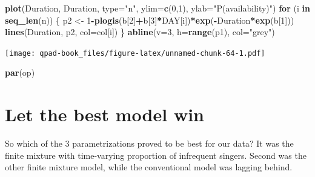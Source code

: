 \documentclass[12pt,]{book}
\newenvironment{Shaded}{\begin{snugshade}}{\end{snugshade}}
\newcommand{\ControlFlowTok}[1]{\textcolor[rgb]{0.13,0.29,0.53}{\textbf{#1}}}
\newcommand{\DataTypeTok}[1]{\textcolor[rgb]{0.13,0.29,0.53}{#1}}
\newcommand{\DecValTok}[1]{\textcolor[rgb]{0.00,0.00,0.81}{#1}}
\newcommand{\KeywordTok}[1]{\textcolor[rgb]{0.13,0.29,0.53}{\textbf{#1}}}
\newcommand{\NormalTok}[1]{#1}
\newcommand{\OperatorTok}[1]{\textcolor[rgb]{0.81,0.36,0.00}{\textbf{#1}}}
\newcommand{\StringTok}[1]{\textcolor[rgb]{0.31,0.60,0.02}{#1}}
\begin{document}
\begin{Shaded}
\begin{Highlighting}[]
\KeywordTok{plot}\NormalTok{(Duration, Duration, }\DataTypeTok{type=}\StringTok{"n"}\NormalTok{, }\DataTypeTok{ylim=}\KeywordTok{c}\NormalTok{(}\DecValTok{0}\NormalTok{,}\DecValTok{1}\NormalTok{),}
    \DataTypeTok{ylab=}\StringTok{"P(availability)"}\NormalTok{)}
\ControlFlowTok{for}\NormalTok{ (i }\ControlFlowTok{in} \KeywordTok{seq_len}\NormalTok{(n)) \{}
\NormalTok{    p2 <-}\StringTok{ }\DecValTok{1}\OperatorTok{-}\KeywordTok{plogis}\NormalTok{(b[}\DecValTok{2}\NormalTok{]}\OperatorTok{+}\NormalTok{b[}\DecValTok{3}\NormalTok{]}\OperatorTok{*}\NormalTok{DAY[i])}\OperatorTok{*}\KeywordTok{exp}\NormalTok{(}\OperatorTok{-}\NormalTok{Duration}\OperatorTok{*}\KeywordTok{exp}\NormalTok{(b[}\DecValTok{1}\NormalTok{]))}
    \KeywordTok{lines}\NormalTok{(Duration, p2, }\DataTypeTok{col=}\NormalTok{col[i])}
\NormalTok{\}}
\KeywordTok{abline}\NormalTok{(}\DataTypeTok{v=}\DecValTok{3}\NormalTok{, }\DataTypeTok{h=}\KeywordTok{range}\NormalTok{(p1), }\DataTypeTok{col=}\StringTok{"grey"}\NormalTok{)}
\end{Highlighting}
\end{Shaded}

\texttt{[image: qpad-book\_files/figure-latex/unnamed-chunk-64-1.pdf]}

\begin{Shaded}
\begin{Highlighting}[]
\KeywordTok{par}\NormalTok{(op)}
\end{Highlighting}
\end{Shaded}

\hypertarget{let-the-best-model-win}{%
\section{Let the best model win}\label{let-the-best-model-win}}

So which of the 3 parametrizations proved to be best for our data?
It was the finite mixture with time-varying proportion of infrequent singers.
Second was the other finite mixture model, while the conventional model
was lagging behind.

\begin{Shaded}
\end{Shaded}
\end{document}
